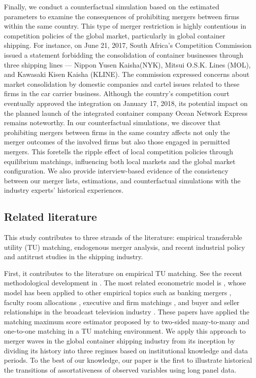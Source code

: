 \documentclass[10pt]{article}
\begin{document}
Finally, we conduct a counterfactual simulation based on the estimated parameters to examine the consequences of prohibiting mergers between firms within the same country.
This type of merger restriction is highly contentious in competition policies of the global market, particularly in global container shipping.
For instance, on June 21, 2017, South Africa's Competition Commission issued a statement forbidding the consolidation of container businesses through three shipping lines — Nippon Yusen Kaisha(NYK), Mitsui O.S.K. Lines (MOL), and Kawasaki Kisen Kaisha (KLINE). 
The commission expressed concerns about market consolidation by domestic companies and cartel issues related to these firms in the car carrier business.
Although the country's competition court eventually approved the integration on January 17, 2018, its potential impact on the planned launch of the integrated container company Ocean Network Express remains noteworthy.
In our counterfactual simulations, we discover that prohibiting mergers between firms in the same country affects not only the merger outcomes of the involved firms but also those engaged in permitted mergers. 
This foretells the ripple effect of local competition policies through equilibrium matchings, influencing both local markets and the global market configuration. 
We also provide interview-based evidence of the consistency between our merger lists, estimations, and counterfactual simulations with the industry experts' historical experiences.

\subsection{Related literature}

This study contributes to three strands of the literature: empirical transferable utility (TU) matching, endogenous merger analysis, and recent industrial policy and antitrust studies in the shipping industry.

First, it contributes to the literature on empirical TU matching. 
See the recent methodological development in \cite{agarwal2021market}.
The most related econometric model is \cite{fox2010qe,fox2018qe}, whose model has been applied to other empirical topics such as banking mergers \citep{akkus2015ms,chen2013ijio}, faculty room allocations \citep{baccara2012aer}, executive and firm matchings \citep{pan2017determinants}, and buyer and seller relationships in the broadcast television industry \citep{stahl2016aer}. 
These papers have applied the matching maximum score estimator proposed by \cite{fox2010qe,fox2018qe} to two-sided many-to-many and one-to-one matching in a TU matching environment. 
We apply this approach to merger waves in the global container shipping industry from its inception by dividing its history into three regimes based on institutional knowledge and data periods.
To the best of our knowledge, our paper is the first to illustrate historical the transitions of assortativeness of observed variables using long panel data.
\end{document}
